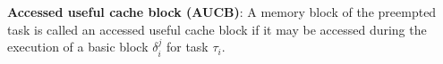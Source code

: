 %
%
\begin{definition}
\textbf{Accessed useful cache block (AUCB)}: A memory block of the preempted task is called an accessed useful cache block if it may be accessed during the execution of a basic block \begin{math}\delta_{i}^{j}\end{math} for task \begin{math}\tau_{i}\end{math}.
\end{definition}

